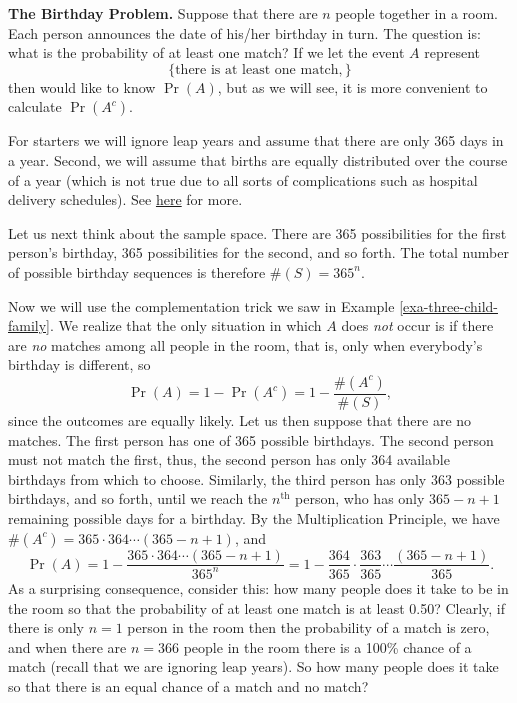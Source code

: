 \documentclass[captions=tableheading]{scrbook}
\begin{document}
\begin{example}
\textbf{The Birthday Problem.} Suppose that there are \(n\) people together in a room. Each person announces the date of his/her birthday in turn. The question is: what is the probability of at least one match? If we let the event \(A\) represent 
\[
\{ \mbox{there is at least one match}, \}
\]
then would like to know \(\Pr(A)\), but as we will see, it is more convenient to calculate \(\Pr(A^{c})\).

For starters we will ignore leap years and assume that there are only 365 days in a year. Second, we will assume that births are equally distributed over the course of a year (which is not true due to all sorts of complications such as hospital delivery schedules). See \href{http://en.wikipedia.org/wiki/Birthday_problem}{here} for more.

Let us next think about the sample space. There are 365 possibilities for the first person's birthday, 365 possibilities for the second, and so forth. The total number of possible birthday sequences is therefore \(\#(S)=365^{n}\).

Now we will use the complementation trick we saw in Example \ref{exa-three-child-family}. We realize that the only situation in which \(A\) does \emph{not} occur is if there are \emph{no} matches among all people in the room, that is, only when everybody's birthday is different, so
\[
\Pr(A)=1-\Pr(A^{c})=1-\frac{\#(A^{c})}{\#(S)},
\]
since the outcomes are equally likely. Let us then suppose that there are no matches. The first person has one of 365 possible birthdays. The second person must not match the first, thus, the second person has only 364 available birthdays from which to choose. Similarly, the third person has only 363 possible birthdays, and so forth, until we reach the \(n^{\mathrm{th}}\) person, who has only \(365-n+1\) remaining possible days for a birthday. By the Multiplication Principle, we have \(\#(A^{c})=365\cdot364\cdots(365-n+1)\), and
\begin{equation}
\Pr(A)=1-\frac{365\cdot364\cdots(365-n+1)}{365^{n}}=1-\frac{364}{365}\cdot\frac{363}{365}\cdots\frac{(365-n+1)}{365}.
\end{equation}
As a surprising consequence, consider this: how many people does it take to be in the room so that the probability of at least one match is at least 0.50? Clearly, if there is only \(n=1\) person in the room then the probability of a match is zero, and when there are \(n=366\) people in the room there is a 100\% chance of a match (recall that we are ignoring leap years). So how many people does it take so that there is an equal chance of a match and no match?


\end{example}
\end{document}
